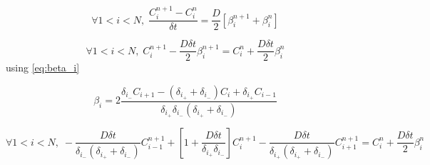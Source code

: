 \documentclass[aps,11pt]{revtex4}
\begin{document}
\begin{equation}
\forall 1<i<N, \; \dfrac{C_i^{n+1}-C_i^{n}}{\delta t} = \dfrac{D}{2} \left[ \beta_i^{n+1} + \beta_i^{n}\right]
\end{equation}

\begin{equation}
\forall 1<i<N, \;  C_i^{n+1} - \dfrac{D\delta t}{2} \beta_i^{n+1} = C_i^{n} +  \dfrac{D\delta t}{2} \beta_i^{n}
\end{equation}
using \eqref{eq:beta_i}

$$
		\beta_i = 2\dfrac{ \delta_{i_-} C_{i+1}  - (\delta_{i_+}+\delta_{i_-})C_i + \delta_{i_+} C_{i-1} }{ \delta_{i_+}\delta_{i_-}(\delta_{i_+}+\delta_{i_-})  }
$$

\begin{equation}
\forall 1<i<N, \;  
- \dfrac{D\delta t}{\delta_{i_-}(\delta_{i_+}+\delta_{i_-})} C_{i-1}^{n+1} + \left[1+\dfrac{D\delta t}{\delta_{i_+}\delta_{i_-}}\right] C_i^{n+1} - \dfrac{D\delta t}{\delta_{i_+}(\delta_{i_+}+\delta_{i_-})}C_{i+1}^{n+1}
= C_i^{n} +  \dfrac{D\delta t}{2} \beta_i^{n}
\end{equation}
\end{document}
